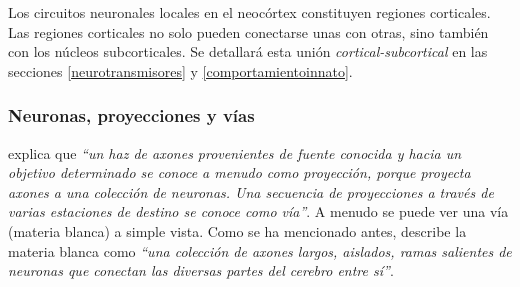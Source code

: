 Los circuitos neuronales locales en el neocórtex constituyen regiones corticales. Las regiones corticales no solo pueden conectarse unas con otras, sino también con los núcleos subcorticales. Se detallará esta unión {\it cortical-subcortical} en las secciones  \ref{neurotransmisores} y \ref{comportamientoinnato}.


\subsubsection{Neuronas, proyecciones y vías}

\cite{Damasio1994} explica que {\it ``un haz de axones provenientes de fuente conocida y hacia un objetivo determinado se conoce a menudo como proyección, porque proyecta axones a una colección de neuronas. Una secuencia de proyecciones a través de varias estaciones de destino se conoce como vía''}. A menudo se puede ver una vía (materia blanca) a simple vista. Como se ha mencionado antes, \cite{Czerner2001} describe la materia blanca como {\it ``una colección de axones largos, aislados, ramas salientes de neuronas que conectan las diversas partes del cerebro entre sí''}.






